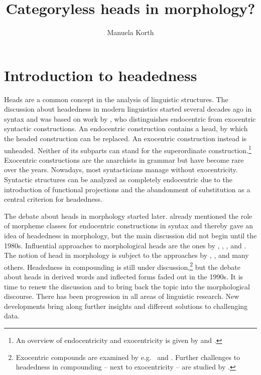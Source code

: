 \documentclass[output=paper
  ,nobabel
  ,draftmode
  ,colorlinks, citecolor=brown
]{langscibook}
\title{Categoryless heads in morphology?}
\author{Manuela Korth\orcid{0000-0002-3750-6131}\affiliation{Universität Potsdam}}
\begin{document}
\maketitle

\section{Introduction to headedness}\label{sec-intro-kor}
Heads are a common concept in the analysis of linguistic structures. The discussion about headedness in modern linguistics started several decades ago in syntax and was based on work by \citet{Bloomfield1933}, who distinguishes endocentric from exocentric syntactic constructions. An endocentric construction contains a head, by which the headed construction can be replaced. An exocentric construction instead is unheaded. Neither of its subparts can stand for the superordinate construction.\footnote{An overview of endocentricity and exocentricity is given by \citet{Hincha1961} and \citet{Barri1975}.}  Exocentric constructions are the anarchists in grammar but have become rare over the years. Nowadays, most syntacticians manage without exocentricity. Syntactic structures can be analyzed as completely endocentric due to the introduction of functional projections and the abandonment of substitution as a central criterion for headedness.

The debate about heads in morphology started later. \citet{Harris1946} already mentioned the role of morpheme classes for endocentric constructions in syntax and thereby gave an idea of headedness in morphology, but the main discussion did not begin until the 1980s. Influential approaches to morphological heads are the ones by \citet{Williams1981}, \citet{Lieber1981, Lieber1992}, \citet{Selkirk1982}, and \citet{DiSciulloWilliams1987}. The notion of head in  morphology is subject to the approaches by \citet{Hoehle1982}, \citet{Reis1983}, \citet{Olsen1986, Olsen1990} and many others. Headedness in compounding is still under discussion,\footnote{Exocentric compounds are examined by e.g.\ \citet{Bauer2008} and \citet{ScaliseEtAl2009}. Further challenges to headedness in compounding – next to exocentricity – are studied by \citet{ScaliseFabregas2010}.} but the debate about heads in derived words and inflected forms faded out in the 1990s. It is time to renew the discussion and to bring back the topic into the morphological discourse. There has been progression in all areas of linguistic research. New developments bring along further insights and different solutions to challenging data. 
\end{document}
